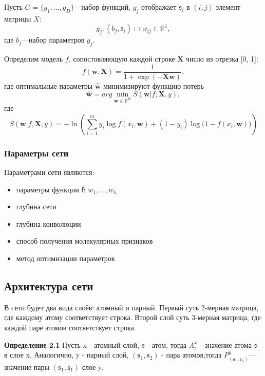 \documentclass[12pt,twoside]{article}
\begin{document}
	Пусть $G = \{g_1,...,g_{D}\}$---набор функций, $g_j$ отображает $\mathfrak{s}_i$ в $(i, j)$ элемент матрицы $X$: $$g_j: (b_j, \mathfrak{s}_i)\mapsto x_{ij} \in \mathbb{R}^1,$$ где $b_j$---набор параметров $g_j$.
	
	Определим модель $f$, сопостовляющую каждой строке $\mathbf{X}$ число из отрезка [0, 1]: $$f(\mathbf{w}, \mathbf{X}) = \frac{1}{1+\exp(-\mathbf{Xw})},$$ где оптимальные параметры $\hat{\mathbf{w}}$ минимизируют функцию потерь $$\hat{\mathbf{w}}=arg\min\limits_{\mathbf{w} \in \mathbb{R}^{D}} S(\mathbf{w}|f, \mathbf{X}, y),$$ где $$S(\mathbf{w}|f, \mathbf{X}, y)=-\ln\left(\sum_{i=1}^m {y_i \log f(x_i, \mathbf{w}) + (1-y_i)\log\bigl(1-f(x_i, \mathbf{w})\bigr)}\right)$$

\subsubsection{Параметры сети}
Параметрами сети являются:
\begin{itemize}
\item параметры функции f: $w_1,\dots,w_n$
\item глубина сети
\item глубина конволюции
\item способ получения молекулярных признаков
\item метод оптимизации параметров
\end{itemize}

\subsection{Архитектура сети}
	В сети будет два вида слоёв: атомный и парный. Первый суть 2-мерная матрица, где каждому атому соответствует строка. Второй слой суть 3-мерная матрица, где каждой паре атомов соответствует строка.
	
	\textbf{Определение 2.1} Пусть x - атомный слой, $\mathfrak{s}$ - атом, тогда $A^x_\mathfrak{s}$ - значение атома $\mathfrak{s}$ в слое x. Аналогично, y - парный слой, $(\mathfrak{s}_1, \mathfrak{s}_2)$ - пара атомов,тогда $P^y_{(\mathfrak{s}_1, \mathfrak{s}_2)}$---значение пары $(\mathfrak{s}_1, \mathfrak{s}_1)$ слое y.
	
\end{document}
